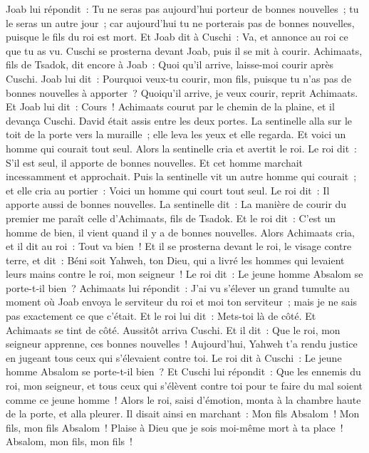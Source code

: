 \begin{multicols}{2}
Joab lui répondit~: Tu ne seras pas aujourd'hui porteur de bonnes nouvelles~; tu le seras un autre jour~; car aujourd'hui tu ne porterais pas de bonnes nouvelles, puisque le fils du roi est mort.
Et Joab dit à Cuschi~: Va, et annonce au roi ce que tu as vu. Cuschi se prosterna devant Joab, puis il se mit à courir.
Achimaats, fils de Tsadok, dit encore à Joab~: Quoi qu'il arrive, laisse-moi courir après Cuschi. Joab lui dit~: Pourquoi veux-tu courir, mon fils, puisque tu n'as pas de bonnes nouvelles à apporter~?
Quoiqu'il arrive, je veux courir, reprit Achimaats. Et Joab lui dit~: Cours~! Achimaats courut par le chemin de la plaine, et il devança Cuschi.
David était assis entre les deux portes. La sentinelle alla sur le toit de la porte vers la muraille~; elle leva les yeux et elle regarda. Et voici un homme qui courait tout seul.
Alors la sentinelle cria et avertit le roi. Le roi dit~: S'il est seul, il apporte de bonnes nouvelles. Et cet homme marchait incessamment et approchait.
Puis la sentinelle vit un autre homme qui courait~; et elle cria au portier~: Voici un homme qui court tout seul. Le roi dit~: Il apporte aussi de bonnes nouvelles.
La sentinelle dit~: La manière de courir du premier me paraît celle d'Achimaats, fils de Tsadok. Et le roi dit~: C'est un homme de bien, il vient quand il y a de bonnes nouvelles.
Alors Achimaats cria, et il dit au roi~: Tout va bien~! Et il se prosterna devant le roi, le visage contre terre, et dit~: Béni soit Yahweh, ton Dieu, qui a livré les hommes qui levaient leurs mains contre le roi, mon seigneur~!
Le roi dit~: Le jeune homme Absalom se porte-t-il bien~? Achimaats lui répondit~: J'ai vu s'élever un grand tumulte au moment où Joab envoya le serviteur du roi et moi ton serviteur~; mais je ne sais pas exactement ce que c'était.
Et le roi lui dit~: Mets-toi là de côté. Et Achimaats se tint de côté.
Aussitôt arriva Cuschi. Et il dit~: Que le roi, mon seigneur apprenne, ces bonnes nouvelles~! Aujourd'hui, Yahweh t'a rendu justice en jugeant tous ceux qui s'élevaient contre toi.
Le roi dit à Cuschi~: Le jeune homme Absalom se porte-t-il bien~? Et Cuschi lui répondit~: Que les ennemis du roi, mon seigneur, et tous ceux qui s'élèvent contre toi pour te faire du mal soient comme ce jeune homme~!
Alors le roi, saisi d'émotion, monta à la chambre haute de la porte, et alla pleurer. Il disait ainsi en marchant~: Mon fils Absalom~! Mon fils, mon fils Absalom~! Plaise à Dieu que je sois moi-même mort à ta place~! Absalom, mon fils, mon fils~!

\end{multicols}
